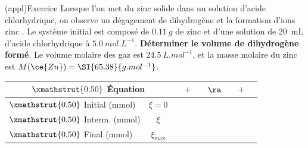 \documentclass[../../main/main.tex]{subfiles}
\begin{document}
\begin{tcb}[width=\linewidth, breakable](appl){Exercice}
	Lorsque l'on met du zinc solide dans un solution d'acide chlorhydrique, on
	observe un dégagement de dihydrogène et la formation d'ions zinc
	.
	\smallbreak
	Le système initial est composé de $\SI{0.11}{g}$ de zinc et
	d'une solution de \SI{20}{mL} d'acide chlorhydrique à $\SI{5.0}{mol.L^{-1}}$.
	\smallbreak
	\textbf{Déterminer le volume de dihydrogène formé}.
	\smallbreak
	Le volume molaire des gaz est $\SI{24.5}{L.mol^{-1}}$, et la masse molaire du
	zinc est $M(\ce{Zn}) = \SI{65.38}{g.mol^{-1}}$.
	\tcblower
	\begin{center}
		\def\rhgt{0.50}
		\centering
		\begin{tabularx}{\linewidth}{|l|c|YdYdYdY|}
			\hline
			\multicolumn{2}{|c|}{
				$\xmathstrut{\rhgt}$
			\textbf{Équation}}         &
			        & $+$          &
			       & $\ra$        &
			 & $+$          &
			                       \\
			\hline
			$\xmathstrut{\rhgt}$
			Initial (\si{mmol})        & $\xi = 0$    &
			         & \vline       &
			          & \vline       &
			            & \vline       &
			                             \\
			\hline
			$\xmathstrut{\rhgt}$
			Interm. (\si{mmol})        & $\xi$        &
			    & \vline       &
			    & \vline       &
			\csw{$\xi$}                & \vline       &
			\csw{$\xi$}                                 \\
			\hline
			$\xmathstrut{\rhgt}$
			Final (\si{mmol})          & $\xi_{\max}$ &
			            & \vline       &
			        & \vline       &
			         & \vline       &
			                          \\
			\hline
		\end{tabularx}
	\end{center}
\end{tcb}
\end{document}
